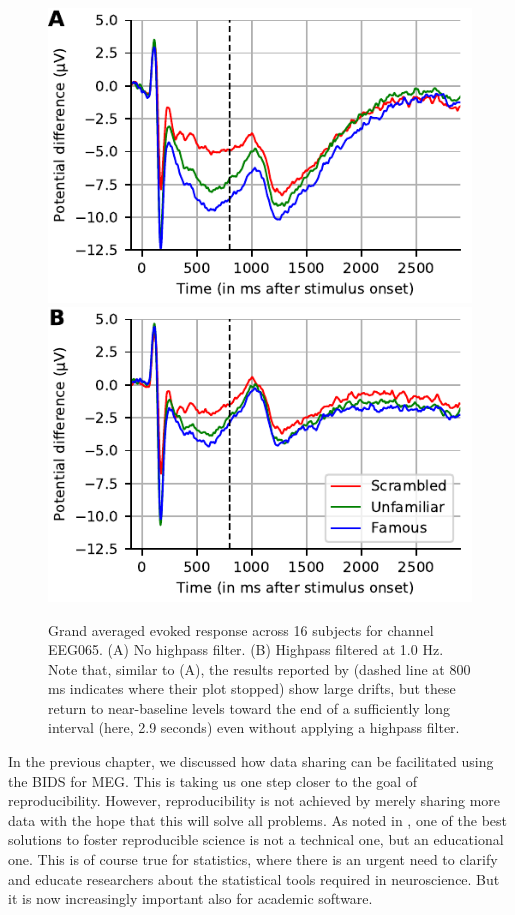 \begin{figure}[t]
  \centering
  \includegraphics[width=0.7\linewidth]{figures/grand_average_highpass-NoneHz.pdf}\\
  \includegraphics[width=0.7\linewidth]{figures/grand_average_highpass-1Hz.pdf}
\caption[Grand averaged evoked response across 16 subjects.]{Grand averaged evoked response across 16 subjects for channel EEG065.
(A) No highpass filter. (B) Highpass filtered at 1.0 Hz. Note that, similar to (A), the results reported by \cite{wakeman2015multi} (dashed line at 800 ms indicates where their plot stopped) show large drifts, but these return to near-baseline levels toward the end of a sufficiently long interval (here, 2.9 seconds) even without applying a highpass filter.}
\label{fig:grand_average}
\end{figure}  

In the previous chapter, we discussed how data sharing can be facilitated using the \ac{BIDS} for \ac{MEG}. This is taking us one step closer to the goal of reproducibility. However, reproducibility is not achieved by merely sharing more data with the hope that this will solve all problems. As noted in \citet{baker20161}, one of the best solutions to foster reproducible science is not a technical one, but an educational one. This is of course true for statistics, where there is an urgent need to clarify and educate researchers about the statistical tools required in neuroscience. But it is now increasingly important also for academic software.

